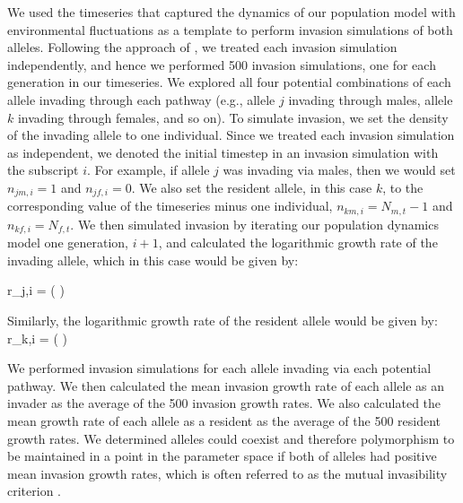 \documentclass[12pt]{article}
\let\oldequation\equation
\let\oldendequation\endequation
\renewenvironment{equation}
  {\linenomathNonumbers\oldequation}
  {\oldendequation\endlinenomath}
\begin{document}
We used the timeseries that captured the dynamics of our population model with environmental fluctuations as a template to perform invasion simulations of both alleles. Following the approach of \citet{shoemaker2020}, we treated each invasion simulation independently, and hence we performed 500 invasion simulations, one for each generation in our timeseries. We explored all four potential combinations of each allele invading through each pathway (e.g., allele $j$ invading through males, allele $k$ invading through females, and so on). To simulate invasion, we set the density of the invading allele to one individual. Since we treated each invasion simulation as independent, we denoted the initial timestep in an invasion simulation with the subscript $i$. For example, if allele $j$ was invading via males, then we would set $n_{jm,i} = 1$ and $n_{jf,i}= 0$. We also set the resident allele, in this case $k$, to the corresponding value of the timeseries minus one individual, $n_{km,i} = N_{m,t} -1$ and $n_{kf,i} = N_{f,t}$. We then simulated invasion by iterating our population dynamics model one generation, $i+1$, and calculated the logarithmic growth rate of the invading allele, which in this case would be given by:


\begin{equation}
r_{j,i} =	\ln \left (  \right )
\label{invader}
\end{equation}

Similarly, the logarithmic growth rate of the resident allele would be given by:
\begin{equation}
r_{k,i} =	\ln \left (  \right )
\label{resident}
\end{equation}

We performed invasion simulations for each allele invading via  each potential pathway. We then calculated the mean invasion growth rate of each allele as an invader as the average of the 500 invasion growth rates. We also calculated the mean growth rate of each allele as a resident as the average of the 500 resident growth rates. We determined alleles could coexist  and therefore polymorphism to be maintained in a point in the parameter space if both of alleles had positive mean invasion growth rates, which is often referred to as the mutual invasibility criterion \citep{barabas_chessons_2018}.
\end{document}
